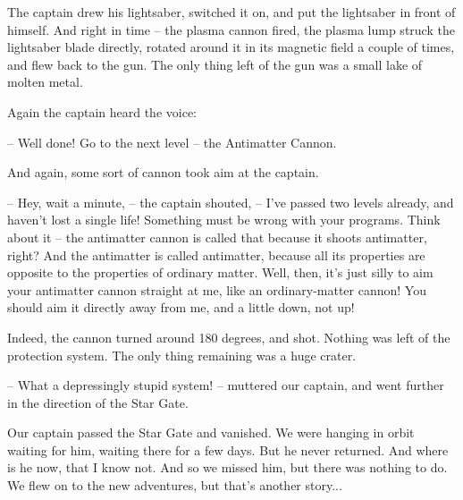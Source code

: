 \documentclass[ebook,oneside,final,openright]{memoir}
\begin{document}
The captain drew his lightsaber, switched it on, and put the lightsaber in front of himself. And right in time – the plasma cannon fired, the plasma lump struck the lightsaber blade directly, rotated around it in its magnetic field a couple of times, and flew back to the gun. The only thing left of the gun was a small lake of molten metal.\par
\par
Again the captain heard the voice:\par
– Well done! Go to the next level – the Antimatter Cannon.\par
And again, some sort of cannon took aim at the captain.\par
– Hey, wait a minute, – the captain shouted, – I’ve passed two levels already, and haven’t lost a single life! Something must be wrong with your programs. Think about it – the antimatter cannon is called that because it shoots antimatter, right? And the antimatter is called antimatter, because all its properties are opposite to the properties of ordinary matter. Well, then, it’s just silly to aim your antimatter cannon straight at me, like an ordinary-matter cannon! You should aim it directly away from me, and a little down, not up!\par
\par
Indeed, the cannon turned around 180 degrees, and shot. Nothing was left of the protection system. The only thing remaining was a huge crater.\par
– What a depressingly stupid system! – muttered our captain, and went further in the direction of the Star Gate.\par
\par
Our captain passed the Star Gate and vanished. We were hanging in orbit waiting for him, waiting there for a few days. But he never returned. And where is he now, that I know not. And so we missed him, but there was nothing to do. We flew on to the new adventures, but that’s another story...
\end{document}
